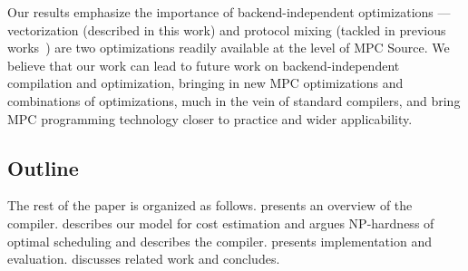 Our results emphasize the importance of backend-independent optimizations --- vectorization (described in this work) and protocol mixing (tackled in previous works~\cite{CCS:BDKKS18,Ishaq:2019, Fang:2022}) are two optimizations readily available at the level of MPC Source. We believe that our work can lead to future work on backend-independent compilation and optimization, bringing in new MPC optimizations and combinations of optimizations, much in the vein of standard compilers, and bring MPC programming technology closer to practice and wider applicability.

\subsection{Outline}

The rest of the paper is organized as follows.  presents an overview of the compiler.  describes our model for cost estimation and argues NP-hardness of optimal scheduling and  describes the compiler.  presents implementation and evaluation.  discusses related work and  concludes.

